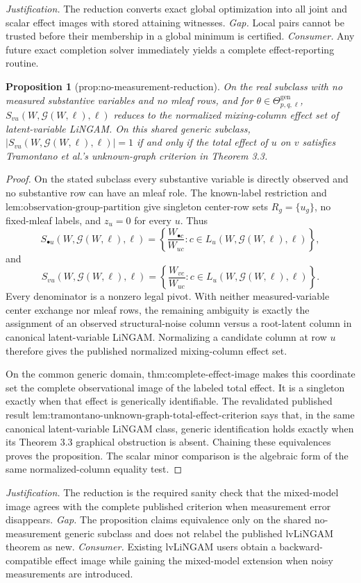 \documentclass{article}
\newtheorem{proposition}{Proposition}
\begin{document}
\par\smallskip\noindent \textit{Justification.} The reduction converts exact global optimization into all joint and scalar effect images with stored attaining witnesses. \textit{Gap.} Local pairs cannot be trusted before their membership in a global minimum is certified. \textit{Consumer.} Any future exact completion solver immediately yields a complete effect-reporting routine.

\begin{proposition}[prop:no-measurement-reduction]\label{prop:no-measurement-reduction}
On the real subclass with no measured substantive variables and no mleaf rows, and for \(\theta\in\Theta_{p,q,\ell}^{\mathrm{gen}}\), \(S_{vu}(W,\mathcal G(W,\ell),\ell)\) reduces to the normalized mixing-column effect set of latent-variable LiNGAM. On this shared generic subclass, \(|S_{vu}(W,\mathcal G(W,\ell),\ell)|=1\) if and only if the total effect of \(u\) on \(v\) satisfies Tramontano et al.'s unknown-graph criterion in Theorem 3.3.
\end{proposition}
\begin{proof}
On the stated subclass every substantive variable is directly observed and no substantive row can have an mleaf role. The known-label restriction and \(\text{lem:observation-group-partition}\) give singleton center-row sets \(R_g=\{u_g\}\), no fixed-mleaf labels, and \(z_u=0\) for every \(u\). Thus
\[
S_{\bullet u}(W,\mathcal G(W,\ell),\ell)
=\left\{\frac{W_{\bullet c}}{W_{uc}}:c\in L_u(W,\mathcal G(W,\ell),\ell)\right\},
\]
and
\[
S_{vu}(W,\mathcal G(W,\ell),\ell)
=\left\{\frac{W_{vc}}{W_{uc}}:c\in L_u(W,\mathcal G(W,\ell),\ell)\right\}.
\]
Every denominator is a nonzero legal pivot. With neither measured-variable center exchange nor mleaf rows, the remaining ambiguity is exactly the assignment of an observed structural-noise column versus a root-latent column in canonical latent-variable LiNGAM. Normalizing a candidate column at row \(u\) therefore gives the published normalized mixing-column effect set.

On the common generic domain, \(\text{thm:complete-effect-image}\) makes this coordinate set the complete observational image of the labeled total effect. It is a singleton exactly when that effect is generically identifiable. The revalidated published result \(\text{lem:tramontano-unknown-graph-total-effect-criterion}\) says that, in the same canonical latent-variable LiNGAM class, generic identification holds exactly when its Theorem 3.3 graphical obstruction is absent. Chaining these equivalences proves the proposition. The scalar minor comparison is the algebraic form of the same normalized-column equality test.
\end{proof}
\par\smallskip\noindent \textit{Justification.} The reduction is the required sanity check that the mixed-model image agrees with the complete published criterion when measurement error disappears. \textit{Gap.} The proposition claims equivalence only on the shared no-measurement generic subclass and does not relabel the published lvLiNGAM theorem as new. \textit{Consumer.} Existing lvLiNGAM users obtain a backward-compatible effect image while gaining the mixed-model extension when noisy measurements are introduced.
\end{document}
